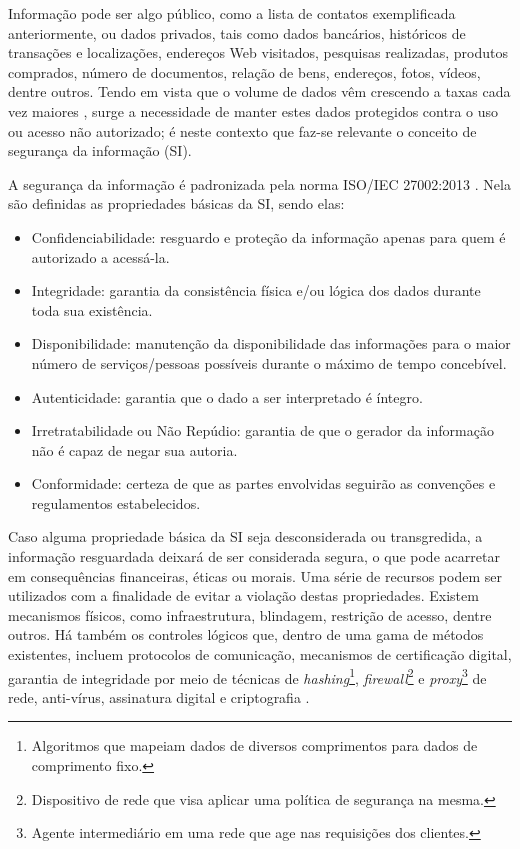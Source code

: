 \documentclass[12pt]{article}
\newcommand{\web}{Web\xspace}
\begin{document}
            
            
            Informação pode ser algo público, como a lista de contatos exemplificada anteriormente, ou dados privados, tais como dados bancários, históricos de transações e localizações, endereços \web visitados, pesquisas realizadas, produtos comprados, número de documentos, relação de bens, endereços, fotos, vídeos, dentre outros. Tendo em vista que o volume de dados vêm crescendo a taxas cada vez maiores \cite{weekly2017volume}, surge a necessidade de manter estes dados protegidos contra o uso ou acesso não autorizado; é neste contexto que faz-se relevante o conceito de segurança da informação (SI).
            
            A segurança da informação é padronizada pela norma ISO/IEC 27002:2013 \cite{iso2013si}. Nela são definidas as propriedades básicas da SI, sendo elas:
            
            \begin{itemize}
                \item Confidenciabilidade: resguardo e proteção da informação apenas para quem é autorizado a acessá-la.
                \item Integridade: garantia da consistência física e/ou lógica dos dados durante toda sua existência.
                \item Disponibilidade: manutenção da disponibilidade das informações para o maior número de serviços/pessoas possíveis durante o máximo de tempo concebível.
                \item Autenticidade: garantia que o dado a ser interpretado é íntegro.
                \item Irretratabilidade ou Não Repúdio: garantia de que o gerador da informação não é capaz de negar sua autoria.
                \item Conformidade: certeza de que as partes envolvidas seguirão as convenções e regulamentos estabelecidos.
            \end{itemize}
            
            Caso alguma propriedade básica da SI seja desconsiderada ou transgredida, a informação resguardada deixará de ser considerada segura, o que pode acarretar em consequências financeiras, éticas ou morais. Uma série de recursos podem ser utilizados com a finalidade de evitar a violação destas propriedades. Existem mecanismos físicos, como infraestrutura, blindagem, restrição de acesso, dentre outros. Há também os controles lógicos que, dentro de uma gama de métodos existentes, incluem protocolos de comunicação, mecanismos de certificação digital, garantia de integridade por meio de técnicas de \textit{hashing}\footnote{Algoritmos que mapeiam dados de diversos comprimentos para dados de comprimento fixo.}, \textit{firewall}\footnote{Dispositivo de rede que visa aplicar uma política de segurança na mesma.} e \textit{proxy}\footnote{Agente intermediário em uma rede que age nas requisições dos clientes.} de rede, anti-vírus, assinatura digital e criptografia \cite{saint2005information}.
            
\end{document}

